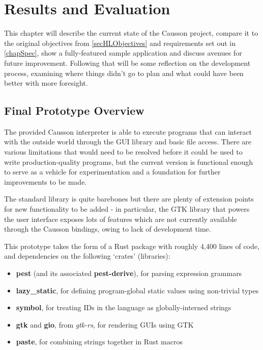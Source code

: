 \documentclass[11pt]{report}
\begin{document}
\chapter{Results and Evaluation} \label{chapResults}

This chapter will describe the current state of the Causson project, compare it to the original objectives from \cref{secHLObjectives} and requirements set out in \cref{chapSpec}, show a fully-featured sample application and discuss avenues for future improvement. Following that will be some reflection on the development process, examining where things didn't go to plan and what could have been better with more foresight.

\section{Final Prototype Overview}

The provided Causson interpreter is able to execute programs that can interact with the outside world through the GUI library and basic file access. There are various limitations that would need to be resolved before it could be used to write production-quality programs, but the current version is functional enough to serve as a vehicle for experimentation and a foundation for further improvements to be made.

The standard library is quite barebones but there are plenty of extension points for new functionality to be added - in particular, the GTK library that powers the user interface exposes lots of features which are not currently available through the Causson bindings, owing to lack of development time.

This prototype takes the form of a Rust package with roughly 4,400 lines of code, and dependencies on the following `crates' (libraries):

\begin{itemize}[nosep,topsep=0pt]
    \item \textbf{pest} (and its associated \textbf{pest-derive}), for parsing expression grammars\cite{pest}
    
    \item \textbf{lazy\_static}, for defining program-global static values using non-trivial types\cite{lazy_static}
    
    \item \textbf{symbol}, for treating IDs in the language as globally-interned strings\cite{symbol}
    
    \item \textbf{gtk} and \textbf{gio}, from \emph{gtk-rs}, for rendering GUIs using GTK\cite{gtkrs}
    
    \item \textbf{paste}, for combining strings together in Rust macros\cite{paste}
\end{itemize}
\end{document}
